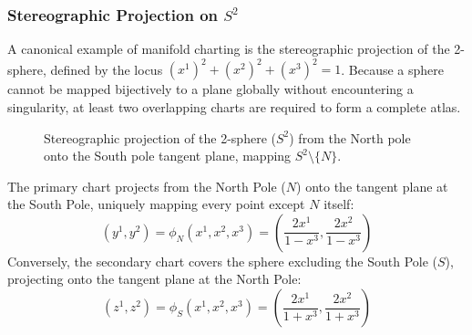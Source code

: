 \documentclass[11pt, a4paper]{report}
\begin{document}
\subsubsection*{Stereographic Projection on $S^2$}
A canonical example of manifold charting is the stereographic projection of the 2-sphere, defined by the locus $(x^1)^2 + (x^2)^2 + (x^3)^2 = 1$. Because a sphere cannot be mapped bijectively to a plane globally without encountering a singularity, at least two overlapping charts are required to form a complete atlas.

\begin{figure}[htbp]
\centering
{}
\caption{Stereographic projection of the 2-sphere ($S^2$) from the North pole onto the South pole tangent plane, mapping $S^2 \setminus \{N\}$.}
\label{fig:stereographic_projection}
\end{figure}


The primary chart projects from the North Pole ($N$) onto the tangent plane at the South Pole, uniquely mapping every point except $N$ itself:
\begin{equation} (y^1, y^2) = \phi_N(x^1, x^2, x^3) = \left( \frac{2x^1}{1-x^3}, \frac{2x^2}{1-x^3} \right) \end{equation}
Conversely, the secondary chart covers the sphere excluding the South Pole ($S$), projecting onto the tangent plane at the North Pole:
\begin{equation} (z^1, z^2) = \phi_S(x^1, x^2, x^3) = \left( \frac{2x^1}{1+x^3}, \frac{2x^2}{1+x^3} \right) \end{equation}
\end{document}
